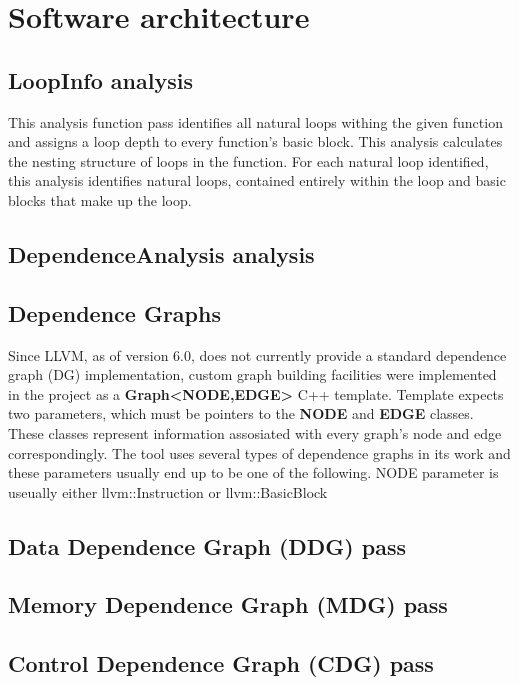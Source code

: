 \section{Software architecture}

\subsection{LoopInfo analysis}
\qquad This analysis function pass identifies all natural loops withing the given function and assigns a loop depth to every function's basic block. This analysis calculates the nesting structure of loops in the function. For each natural loop identified, this analysis identifies natural loops, contained entirely within the loop and basic blocks that make up the loop. 

\subsection{DependenceAnalysis analysis}


\subsection{Dependence Graphs}
\qquad Since LLVM, as of version 6.0, does not currently provide a standard dependence graph (DG) implementation, custom graph building facilities were implemented in the project as a \textbf{Graph\textless \textsc{NODE},\textsc{EDGE}\textgreater} C++ template. Template expects two parameters, which must be pointers to the \textbf{NODE} and \textbf{EDGE} classes. These classes represent information assosiated with every graph's node and edge correspondingly. The tool uses several types of dependence graphs in its work and these parameters usually end up to be one of the following. NODE parameter is useually either llvm::Instruction or llvm::BasicBlock   



\subsection{Data Dependence Graph (DDG) pass}



\subsection{Memory Dependence Graph (MDG) pass}

\subsection{Control Dependence Graph (CDG) pass}


